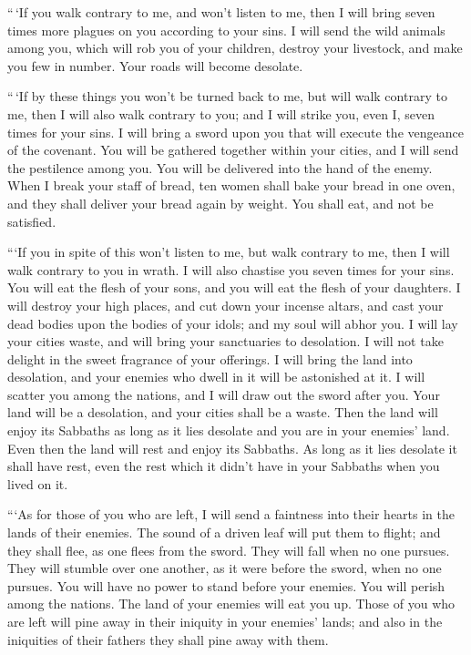 ``\,`If you walk contrary to me, and won't listen to me,
then I will bring seven times more plagues on you according to your
sins.  I will send the wild animals among you, which will
rob you of your children, destroy your livestock, and make you few in
number. Your roads will become desolate.

 ``\,`If by these things you won't be turned back to me,
but will walk contrary to me,  then I will also walk
contrary to you; and I will strike you, even I, seven times for your
sins.  I will bring a sword upon you that will execute the
vengeance of the covenant. You will be gathered together within your
cities, and I will send the pestilence among you. You will be delivered
into the hand of the enemy.  When I break your staff of
bread, ten women shall bake your bread in one oven, and they shall
deliver your bread again by weight. You shall eat, and not be satisfied.

 ```If you in spite of this won't listen to me, but walk
contrary to me,  then I will walk contrary to you in wrath.
I will also chastise you seven times for your sins.  You
will eat the flesh of your sons, and you will eat the flesh of your
daughters.  I will destroy your high places, and cut down
your incense altars, and cast your dead bodies upon the bodies of your
idols; and my soul will abhor you.  I will lay your cities
waste, and will bring your sanctuaries to desolation. I will not take
delight in the sweet fragrance of your offerings.  I will
bring the land into desolation, and your enemies who dwell in it will be
astonished at it.  I will scatter you among the nations,
and I will draw out the sword after you. Your land will be a desolation,
and your cities shall be a waste.  Then the land will enjoy
its Sabbaths as long as it lies desolate and you are in your enemies'
land. Even then the land will rest and enjoy its Sabbaths. 
As long as it lies desolate it shall have rest, even the rest which it
didn't have in your Sabbaths when you lived on it.

 ```As for those of you who are left, I will send a
faintness into their hearts in the lands of their enemies. The sound of
a driven leaf will put them to flight; and they shall flee, as one flees
from the sword. They will fall when no one pursues.  They
will stumble over one another, as it were before the sword, when no one
pursues. You will have no power to stand before your enemies.
 You will perish among the nations. The land of your
enemies will eat you up.  Those of you who are left will
pine away in their iniquity in your enemies' lands; and also in the
iniquities of their fathers they shall pine away with them.

